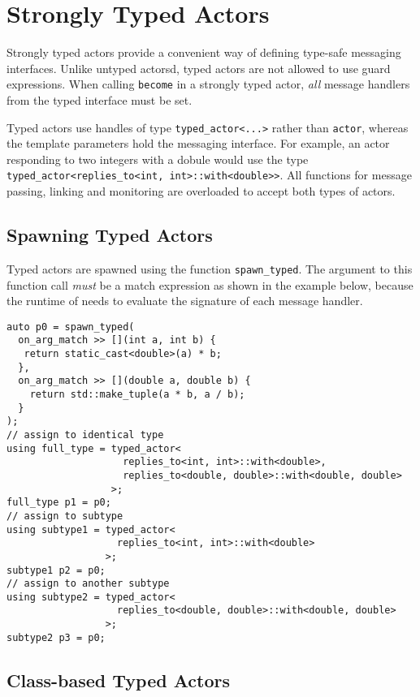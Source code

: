 \section{Strongly Typed Actors}

Strongly typed actors provide a convenient way of defining type-safe messaging interfaces.
Unlike untyped actorsd, typed actors are not allowed to use guard expressions.
When calling \lstinline^become^ in a strongly typed actor, \emph{all} message handlers from the typed interface must be set.

Typed actors use handles of type \lstinline^typed_actor<...>^ rather than \lstinline^actor^, whereas the template parameters hold the messaging interface.
For example, an actor responding to two integers with a dobule would use the type \lstinline^typed_actor<replies_to<int, int>::with<double>>^.
All functions for message passing, linking and monitoring are overloaded to accept both types of actors.

\subsection{Spawning Typed Actors}
\label{sec:strong:spawn}

Typed actors are spawned using the function \lstinline^spawn_typed^.
The argument to this function call \emph{must} be a match expression as shown in the example below, because the runtime of \lib needs to evaluate the signature of each message handler.

\begin{lstlisting}
auto p0 = spawn_typed(
  on_arg_match >> [](int a, int b) {
   return static_cast<double>(a) * b;
  },
  on_arg_match >> [](double a, double b) {
    return std::make_tuple(a * b, a / b);
  }
);
// assign to identical type
using full_type = typed_actor<
                    replies_to<int, int>::with<double>,
                    replies_to<double, double>::with<double, double>
                  >;
full_type p1 = p0;
// assign to subtype
using subtype1 = typed_actor<
                   replies_to<int, int>::with<double>
                 >;
subtype1 p2 = p0;
// assign to another subtype
using subtype2 = typed_actor<
                   replies_to<double, double>::with<double, double>
                 >;
subtype2 p3 = p0;
\end{lstlisting}

\clearpage
\subsection{Class-based Typed Actors}

